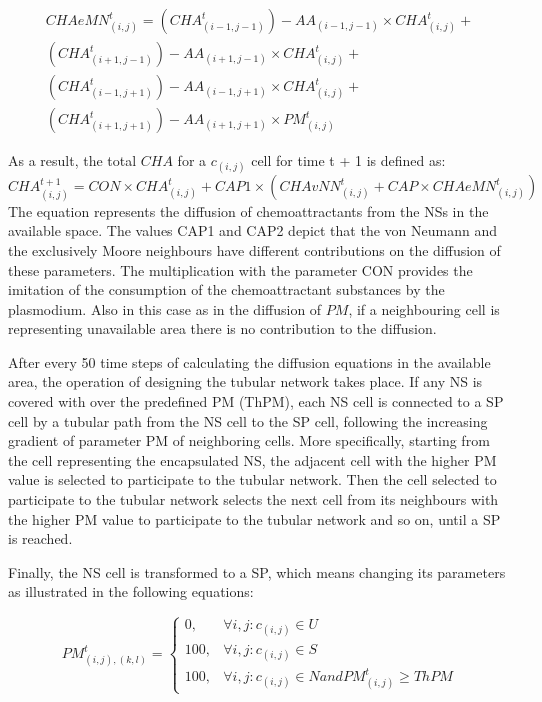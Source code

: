 \begin{equation}
\begin{split}
CHAeMN^t_{(i, j)} = 
(CHA^t_{(i-1, j-1)}) - AA_{(i-1, j-1)} \times CHA^t_{(i, j)} +
\\(CHA^t_{(i+1, j-1)}) - AA_{(i+1, j-1)} \times CHA^t_{(i, j)} +
\\(CHA^t_{(i-1, j+1)}) - AA_{(i-1, j+1)} \times CHA^t_{(i, j)}  +
\\(CHA^t_{(i+1, j+1)}) - AA_{(i+1, j+1)} \times PM^t_{(i, j)}
\end{split}
\end{equation}

As a result, the total $CHA$ for a $c_{(i,j)}$ cell for time t + 1 is defined as:
\begin{equation}
CHA^{t+1}_{(i, j)} = CON \times {CHA^t_{(i, j)} + CAP1 \times (CHAvNN^t_{(i, j)} + CAP \times CHAeMN^t_{(i, j)})}
\end{equation}
The equation represents the diffusion of chemoattractants from the NSs in the available space. The values CAP1 and CAP2 depict that the von Neumann and the exclusively Moore neighbours have different contributions on the diffusion of these parameters. The multiplication with the parameter CON provides the imitation of the consumption of the chemoattractant substances by the plasmodium. Also in this case as in the diffusion of $PM$, if a neighbouring cell is representing unavailable area there is no contribution to the diffusion.

\par
After every 50 time steps of calculating the diffusion equations in the available area, the operation of designing the tubular network takes place. If any NS is covered with over the predefined PM (ThPM), each NS cell is connected to a SP cell by a tubular path from the NS cell to the SP cell, following the increasing gradient of parameter PM of neighboring cells. 
More specifically, starting from the cell representing the encapsulated NS, the adjacent cell with the higher PM value is selected to participate to the tubular network. Then the cell selected to participate to the tubular network selects the next cell from its neighbours with the higher PM value to participate to the tubular network and so on, until a SP is reached.

\par
Finally, the NS cell is transformed to a SP, which means changing its parameters as illustrated in the following equations:

\begin{equation}
PM^t_{(i, j),(k,l)}=
\begin{cases} 
0, & \forall i, j: c_{(i,j)} \in U \\ 
100, & \forall i, j: c_{(i,j)} \in S \\ 
100, & \forall i, j: c_{(i,j)} \in N and  PM^t_{(i, j)} \geq ThPM 
\end{cases}
\end{equation}

